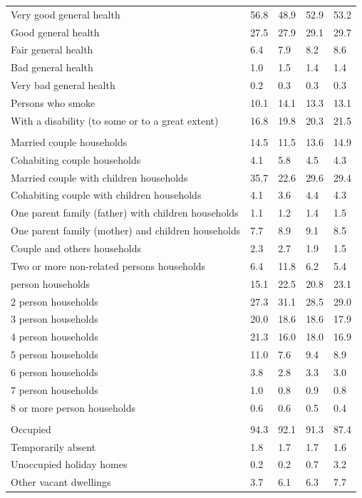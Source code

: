 \documentclass{article}
\begin{document}
\begin{table}[h]
\begin{tabular}{KTTTT}
    \hline
Very good general health & 56.8& 48.9&52.9& 53.2\\
Good general health & 27.5& 27.9& 29.1& 29.7\\
Fair general health & 6.4& 7.9&8.2& 8.6\\
Bad general health & 1.0& 1.5&1.4& 1.4\\
Very bad general health & 0.2& 0.3&0.3& 0.3\\
    \hline
Persons who smoke & 10.1& 14.1&13.3& 13.1\\
    \hline
With a disability (to some or to a great extent) & 16.8& 19.8&20.3& 21.5\\
\hline
    \\ 
    \hline
Married couple households & 14.5& 11.5& 13.6& 14.9\\
Cohabiting couple households & 4.1& 5.8& 4.5& 4.3\\
Married couple with children households & 35.7& 22.6& 29.6& 29.4\\
Cohabiting couple with children households & 4.1& 3.6& 4.4& 4.3\\
One parent family (father) with  children households & 1.1& 1.2& 1.4& 1.5\\
One parent family (mother) and children households & 7.7& 8.9& 9.1& 8.5\\
Couple and others households  & 2.3& 2.7& 1.9& 1.5\\
Two or more non-related persons households &  6.4& 11.8&  6.2&  5.4\\
     person households & 15.1& 22.5& 20.8& 23.1\\
2 person households & 27.3& 31.1& 28.5& 29.0\\
3 person households & 20.0& 18.6& 18.6& 17.9\\
4 person households & 21.3& 16.0& 18.0& 16.9\\
5 person households & 11.0&  7.6&  9.4&  8.9\\
6 person households & 3.8& 2.8& 3.3& 3.0\\
7 person households & 1.0& 0.8& 0.9& 0.8\\
8 or more person households & 0.6& 0.6& 0.5& 0.4\\
\hline
    \\ 
    \hline
Occupied & 94.3& 92.1& 91.3& 87.4\\
Temporarily absent & 1.8& 1.7& 1.7& 1.6\\
Unoccupied holiday homes & 0.2& 0.2& 0.7& 3.2\\
Other vacant dwellings & 3.7& 6.1& 6.3& 7.7\\
\hline
\end{tabular}
\end{table}
\end{document}
